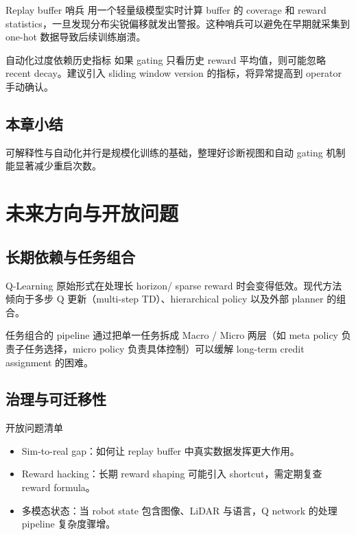 \documentclass[a4paper]{article}
\begin{document}
\begin{importantbox}{Replay buffer 哨兵}
用一个轻量级模型实时计算 buffer 的 coverage 和 reward statistics，一旦发现分布尖锐偏移就发出警报。这种哨兵可以避免在早期就采集到 one-hot 数据导致后续训练崩溃。
\end{importantbox}

\begin{warningbox}{自动化过度依赖历史指标}
如果 gating 只看历史 reward 平均值，则可能忽略 recent decay。建议引入 sliding window version 的指标，将异常提高到 operator 手动确认。
\end{warningbox}

\subsection{本章小结}

可解释性与自动化并行是规模化训练的基础，整理好诊断视图和自动 gating 机制能显著减少重启次数。

\section{未来方向与开放问题}

\subsection{长期依赖与任务组合}

Q-Learning 原始形式在处理长 horizon/ sparse reward 时会变得低效。现代方法倾向于多步 Q 更新（multi-step TD）、hierarchical policy 以及外部 planner 的组合。

\begin{importantbox}{任务组合的 pipeline}
通过把单一任务拆成 Macro / Micro 两层（如 meta policy 负责子任务选择，micro policy 负责具体控制）可以缓解 long-term credit assignment 的困难。
\end{importantbox}

\subsection{治理与可迁移性}

\begin{knowledgebox}{开放问题清单}
\begin{itemize}
    \item Sim-to-real gap：如何让 replay buffer 中真实数据发挥更大作用。
    \item Reward hacking：长期 reward shaping 可能引入 shortcut，需定期复查 reward formula。
    \item 多模态状态：当 robot state 包含图像、LiDAR 与语言，Q network 的处理 pipeline 复杂度骤增。
\end{itemize}
\end{knowledgebox}
\end{document}
